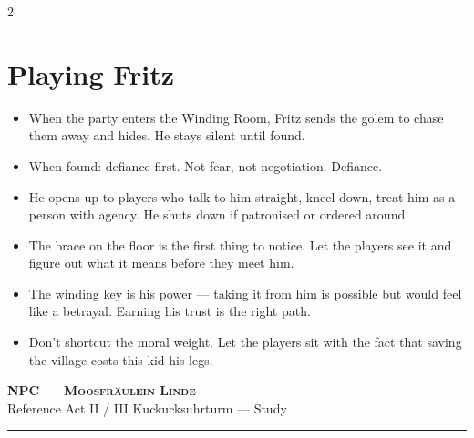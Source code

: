 \documentclass[10pt,letterpaper]{article}
\newcommand{\sceneheader}[4]{%
  \fancyhead[L]{\small\textcolor{accent}{\scshape #1}}%
  \fancyhead[R]{\small\textcolor{accent}{#2 \quad \textbullet \quad #3}}%
  \begin{center}
  {\LARGE\bfseries\scshape\textcolor{accent}{#1}}\\[2pt]
  {\small #2 \quad \textbullet \quad #3 \quad \textbullet \quad #4}\\[2pt]
  \textcolor{rulecol}{\rule{0.5\textwidth}{0.8pt}}
  \end{center}
  \vspace{-4pt}
}
\begin{document}
\begin{multicols}{2}
\section*{Playing Fritz}
\begin{itemize}
\item When the party enters the Winding Room, Fritz sends the golem to chase them away and hides. He stays silent until found.
\item When found: defiance first. Not fear, not negotiation. Defiance.
\item He opens up to players who talk to him straight, kneel down, treat him as a person with agency. He shuts down if patronised or ordered around.
\item The brace on the floor is the first thing to notice. Let the players see it and figure out what it means before they meet him.
\item The winding key is his power --- taking it from him is possible but would feel like a betrayal. Earning his trust is the right path.
\item Don't shortcut the moral weight. Let the players sit with the fact that saving the village costs this kid his legs.
\end{itemize}

\end{multicols}

\newpage


\label{sec:npc-linde}\sceneheader{NPC --- Moosfräulein Linde}{Reference}{Act II / III}{Kuckucksuhrturm --- Study}
\end{document}
